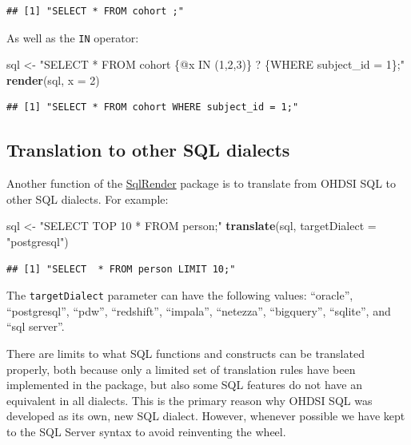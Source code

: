 \documentclass[11pt]{book}
\newenvironment{Shaded}{\begin{snugshade}}{\end{snugshade}}
\newcommand{\DataTypeTok}[1]{\textcolor[rgb]{0.13,0.29,0.53}{#1}}
\newcommand{\DecValTok}[1]{\textcolor[rgb]{0.00,0.00,0.81}{#1}}
\newcommand{\KeywordTok}[1]{\textcolor[rgb]{0.13,0.29,0.53}{\textbf{#1}}}
\newcommand{\NormalTok}[1]{#1}
\newcommand{\StringTok}[1]{\textcolor[rgb]{0.31,0.60,0.02}{#1}}
\theoremstyle{definition}
\theoremstyle{definition}
\theoremstyle{definition}
\theoremstyle{remark}
\let\BeginKnitrBlock\begin \let\EndKnitrBlock\end
\begin{document}
\begin{verbatim}
## [1] "SELECT * FROM cohort ;"
\end{verbatim}

As well as the \texttt{IN} operator:

\begin{Shaded}
\begin{Highlighting}[]
\NormalTok{sql <-}\StringTok{ "SELECT * FROM cohort \{@x IN (1,2,3)\} ? \{WHERE subject_id = 1\};"}
\KeywordTok{render}\NormalTok{(sql, }\DataTypeTok{x =} \DecValTok{2}\NormalTok{)}
\end{Highlighting}
\end{Shaded}

\begin{verbatim}
## [1] "SELECT * FROM cohort WHERE subject_id = 1;"
\end{verbatim}

\hypertarget{translation-to-other-sql-dialects}{%
\subsection{Translation to other SQL dialects}\label{translation-to-other-sql-dialects}}

Another function of the \href{https://ohdsi.github.io/SqlRender/}{SqlRender} package is to translate from OHDSI SQL to other SQL dialects. For example:

\begin{Shaded}
\begin{Highlighting}[]
\NormalTok{sql <-}\StringTok{ "SELECT TOP 10 * FROM person;"}
\KeywordTok{translate}\NormalTok{(sql, }\DataTypeTok{targetDialect =} \StringTok{"postgresql"}\NormalTok{)}
\end{Highlighting}
\end{Shaded}

\begin{verbatim}
## [1] "SELECT  * FROM person LIMIT 10;"
\end{verbatim}

The \texttt{targetDialect} parameter can have the following values: ``oracle'', ``postgresql'', ``pdw'', ``redshift'', ``impala'', ``netezza'', ``bigquery'', ``sqlite'', and ``sql server''.

\BeginKnitrBlock{rmdimportant}
There are limits to what SQL functions and constructs can be translated properly, both because only a limited set of translation rules have been implemented in the package, but also some SQL features do not have an equivalent in all dialects. This is the primary reason why OHDSI SQL was developed as its own, new SQL dialect. However, whenever possible we have kept to the SQL Server syntax to avoid reinventing the wheel.
\EndKnitrBlock{rmdimportant}
\end{document}
